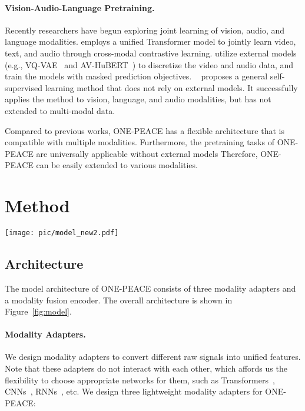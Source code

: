 \documentclass{article}
\newcommand{\onepeace}{ONE-PEACE\xspace}
\begin{document}
\paragraph{Vision-Audio-Language Pretraining.}
Recently researchers have begun exploring joint learning of vision, audio, and language modalities. 
\cite{vatt} employs a unified Transformer model to jointly learn video, text, and audio through cross-modal contrastive learning. 
\cite{icode,vatlm} utilize external models (e.g., VQ-VAE~\cite{vqvae} and AV-HuBERT~\cite{av_hubert}) to discretize the video and audio data, and train the models with masked prediction objectives.
~\cite{data2vec} proposes a general self-supervised learning method that does not rely on external models.
It successfully applies the method to vision, language, and audio modalities, but has not extended to multi-modal data.



Compared to previous works, \onepeace has a flexible architecture that is compatible with multiple modalities. Furthermore, the pretraining tasks of \onepeace are universally applicable without external models
Therefore, \onepeace can be easily extended to various modalities.
%
 \section{Method}
\label{sec:method}

\begin{figure*}[t]
\vskip 0.2in
    \centering
    \texttt{[image: pic/model\_new2.pdf]}
    \caption{\textbf{The architecture of \onepeace}. 
It consists of three modality adapters and a modality fusion encoder.
    \onepeace can be disassembled into different branches to handle different tasks.
    For example, the vision adapter, self-attention layers, and vision FFNs can be combined into V-Branch to handle vision tasks.}
    \label{fig:model}
\end{figure*}

\subsection{Architecture}
The model architecture of \onepeace consists of three modality adapters and a modality fusion encoder.
The overall architecture is shown in Figure~\ref{fig:model}.

\paragraph{Modality Adapters.}
We design modality adapters to convert different raw signals into unified features.
Note that these adapters do not interact with each other, which affords us the flexibility to choose appropriate networks for them, such as Transformers~\cite{transformer,vit,swin}, CNNs~\cite{mnist,resnet}, RNNs~\cite{rnn,gru}, etc.
We design three lightweight modality adapters for \onepeace:
\end{document}
